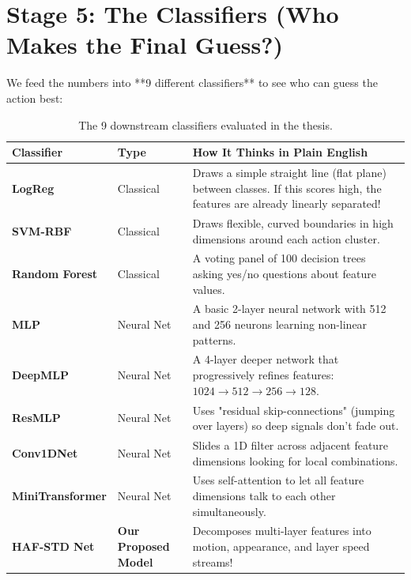 \documentclass[a4paper, 11pt]{article}
\begin{document}
\section{Stage 5: The Classifiers (Who Makes the Final Guess?)}

We feed the numbers into **9 different classifiers** to see who can guess the action best:

\begin{table}[h!]
\centering
\small
\renewcommand{\arraystretch}{1.3}
\begin{tabularx}{\textwidth}{l l X}
\toprule
\textbf{Classifier} & \textbf{Type} & \textbf{How It Thinks in Plain English} \\
\midrule
\textbf{LogReg} & Classical & Draws a simple straight line (flat plane) between classes. If this scores high, the features are already linearly separated! \\
\textbf{SVM-RBF} & Classical & Draws flexible, curved boundaries in high dimensions around each action cluster. \\
\textbf{Random Forest} & Classical & A voting panel of 100 decision trees asking yes/no questions about feature values. \\
\midrule
\textbf{MLP} & Neural Net & A basic 2-layer neural network with 512 and 256 neurons learning non-linear patterns. \\
\textbf{DeepMLP} & Neural Net & A 4-layer deeper network that progressively refines features: $1024 \rightarrow 512 \rightarrow 256 \rightarrow 128$. \\
\textbf{ResMLP} & Neural Net & Uses "residual skip-connections" (jumping over layers) so deep signals don't fade out. \\
\textbf{Conv1DNet} & Neural Net & Slides a 1D filter across adjacent feature dimensions looking for local combinations. \\
\textbf{MiniTransformer} & Neural Net & Uses self-attention to let all feature dimensions talk to each other simultaneously. \\
\midrule
\textbf{HAF-STD Net} & \textbf{Our Proposed Model} & Decomposes multi-layer features into motion, appearance, and layer speed streams! \\
\bottomrule
\end{tabularx}
\caption{The 9 downstream classifiers evaluated in the thesis.}
\end{table}
\end{document}
